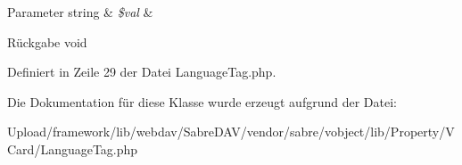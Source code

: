 \begin{DoxyParams}[1]{Parameter}
string & {\em \$val} & \\
\hline
\end{DoxyParams}
\begin{DoxyReturn}{Rückgabe}
void 
\end{DoxyReturn}


Definiert in Zeile 29 der Datei Language\+Tag.\+php.



Die Dokumentation für diese Klasse wurde erzeugt aufgrund der Datei\+:\begin{DoxyCompactItemize}
\item 
Upload/framework/lib/webdav/\+Sabre\+D\+A\+V/vendor/sabre/vobject/lib/\+Property/\+V\+Card/Language\+Tag.\+php\end{DoxyCompactItemize}
